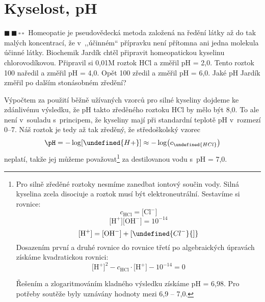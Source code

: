 \documentclass{book}
\let\ch\undefined
\newcommand{\dva}{$\blacksquare \, \blacksquare \, \square \, \square \; \; $}
\renewenvironment{quotation}{\par}{\par} %
\begin{document}
\newpage %
\section{Kyselost, pH}

\begin{quotation}
\dva Homeopatie je pseudovědecká metoda založená na ředění látky až do
tak malých koncentrací, že v~,,účinném`` přípravku není přítomna
ani jedna molekula účinné látky. Biochemik Jardík chtěl připravit
homeopatickou kyselinu chlorovodíkovou. Připravil si 0,01M roztok
HCl a změřil pH = 2,0. Tento roztok 100\texttimes{} naředil a změřil
pH = 4,0. Opět 100\texttimes{} zředil a změřil pH = 6,0. Jaké pH Jardík
změřil po dalším stonásobném zředění?
\end{quotation} \dotfill \par 
Výpočtem za použití běžně užívaných vzorců pro silné kyseliny dojdeme ke zdánlivému výsledku, že pH takto
zředěného roztoku HCl by mělo být 8,0. To ale není v~souladu s~principem,
že kyseliny mají při standardní teplotě pH v~rozmezí 0--7. Náš roztok je tedy až tak zředěný,
že středoškolský vzorec 
\[
\pH=-\log[\ch{H+}]\approx-\log\bigl(c_{\ch{HCl}}\bigr)
\]
neplatí, takže jej můžeme považovat\footnote{Pro silně zředěné roztoky nesmíme zanedbat iontový součin vody. Silná
kyselina zcela disociuje a roztok musí být elektroneutrální. Sestavíme
si rovnice: 
\[
c _{\mathrm{HCl}}  ={[}\mathrm{Cl^{-}}{]} 
\]
\[ {[}\mathrm{H^+ }{]}{[}\mathrm{OH^{-}}{]} =10^{-14}
\]
\[
{[}\mathrm{H^+ }{]} ={[}\mathrm{OH^{-}}{]}+{[}\ch{Cl^{-}}{]}
\]
Dosazením první a druhé rovnice do rovnice třetí po algebraických úpravách
získáme kvadratickou rovnici: 
\[
 {[}\mathrm{H^+ }{]}^{2}-c_{\mathrm{HCl}}\cdot {[}\mathrm{H^+ }{]}-10^{-14}=0
\]

 Řešením a zlogaritmováním kladného výsledku získáme pH = 6,98. Pro
potřeby soutěže byly uznávány hodnoty mezi 6,9 -- 7,0.} za destilovanou vodu s~pH = 7,0.
\end{document}

